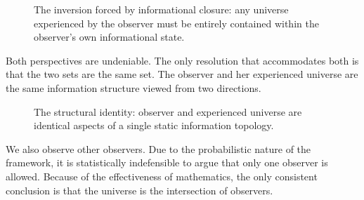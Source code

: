\begin{figure}[htbp]
\centering
{}
\caption{The inversion forced by informational closure: any universe
experienced by the observer must be entirely contained within the
observer's own informational state.}
\label{fig:diag2}
\end{figure}

Both perspectives are undeniable. The only resolution that accommodates
both is that the two sets are the same set. The observer and her
experienced universe are the same information structure viewed from
two directions.

\begin{figure}[htbp]
\centering
{}
\caption{The structural identity: observer and experienced universe are
identical aspects of a single static information topology.}
\label{fig:diag3}
\end{figure}

We also observe other observers. Due to the probabilistic nature of the
framework, it is statistically indefensible to argue that only one
observer is allowed. Because of the effectiveness of mathematics, the
only consistent conclusion is that the universe is the intersection of
observers.

